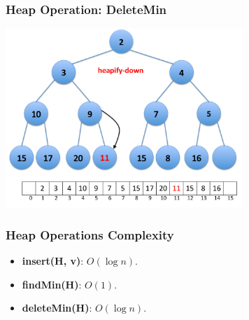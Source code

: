 \documentclass{beamer}
\begin{document}
\begin{frame}[containsverbatim]
\frametitle{Heap Operation: DeleteMin}

\begin{center}
\includegraphics[width=9cm]{heap_delete_min5.pdf}
\end{center}

\end{frame}

\begin{frame}%
\frametitle{Heap Operations Complexity}

\begin{itemize}

\item \textbf{insert(H, v)}: $O(\log n)$.
\vspace{0.6cm}

\item \textbf{findMin(H)}: $O(1)$.
\vspace{0.6cm}

\item \textbf{deleteMin(H)}: $O(\log n)$.

\end{itemize}

\end{frame}
\end{document}
